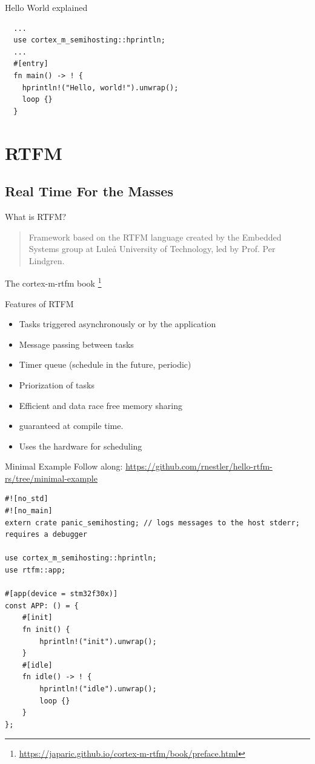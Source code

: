 \documentclass[aspectratio=1610,14pt,t]{beamer}
\begin{document}
\begin{frame}[c,fragile]{Hello World explained}
  \begin{verbatim}
  ...
  use cortex_m_semihosting::hprintln;
  ...
  #[entry]
  fn main() -> ! {
    hprintln!("Hello, world!").unwrap();
    loop {}
  }
  \end{verbatim}
\end{frame}

\section{RTFM}
\subsection{Real Time For the Masses}

\begin{frame}[c]{What is RTFM?}
  \begin{quote}
    Framework based on the RTFM language created by the Embedded Systems group
    at Luleå University of Technology, led by Prof. Per Lindgren.
  \end{quote}
  The cortex-m-rtfm book \footnote{\url{https://japaric.github.io/cortex-m-rtfm/book/preface.html}}
\end{frame}

\begin{frame}[c]{Features of RTFM}
  \begin{itemize}
      \item Tasks triggered asynchronously or by the application
      \item Message passing between tasks
      \item Timer queue (schedule in the future, periodic)
      \item Priorization of tasks
      \item Efficient and data race free memory sharing
      \item {} guaranteed at compile time.
      \item Uses the hardware for scheduling
  \end{itemize}
\end{frame}

\begin{frame}[c,fragile]{Minimal Example}
  \small{Follow along: \url{https://github.com/rnestler/hello-rtfm-rs/tree/minimal-example}}
  \begin{verbatim}
#![no_std]
#![no_main]
extern crate panic_semihosting; // logs messages to the host stderr; requires a debugger

use cortex_m_semihosting::hprintln;
use rtfm::app;

#[app(device = stm32f30x)]
const APP: () = {
    #[init]
    fn init() {
        hprintln!("init").unwrap();
    }
    #[idle]
    fn idle() -> ! {
        hprintln!("idle").unwrap();
        loop {}
    }
};
  \end{verbatim}
\end{frame}
\end{document}
